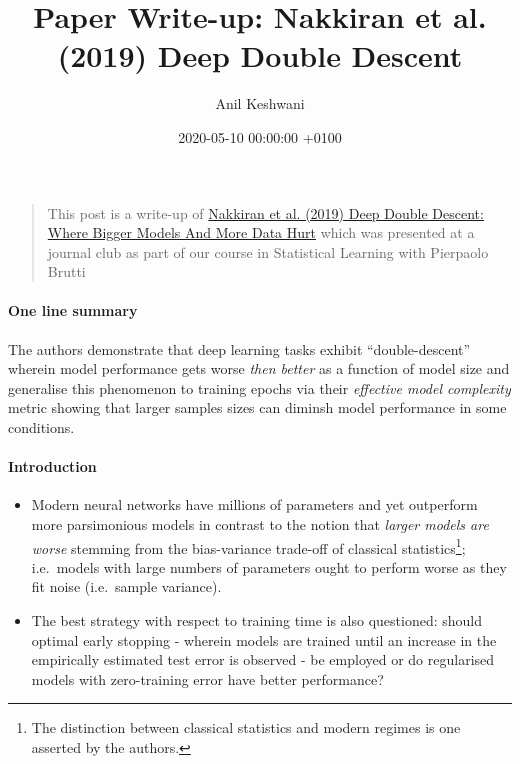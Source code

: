 \documentclass[]{article}
\title{Paper Write-up: Nakkiran et al. (2019) Deep Double Descent}
\author{Anil Keshwani}
\date{2020-05-10 00:00:00 +0100}
\providecommand{\tightlist}{%
  \setlength{\itemsep}{0pt}\setlength{\parskip}{0pt}}
\let\oldparagraph\paragraph
\renewcommand{\paragraph}[1]{\oldparagraph{#1}\mbox{}}
\begin{document}
\maketitle

\begin{quote}
This post is a write-up of
\href{https://arxiv.org/abs/1912.02292}{Nakkiran et al. (2019) Deep
Double Descent: Where Bigger Models And More Data Hurt} which was
presented at a journal club as part of our course in Statistical
Learning with Pierpaolo Brutti
\end{quote}

\hypertarget{one-line-summary}{%
\paragraph{One line summary}\label{one-line-summary}}

The authors demonstrate that deep learning tasks exhibit
``double-descent'' wherein model performance gets worse \emph{then
better} as a function of model size and generalise this phenomenon to
training epochs via their \emph{effective model complexity} metric
showing that larger samples sizes can diminsh model performance in some
conditions.

\hypertarget{introduction}{%
\paragraph{Introduction}\label{introduction}}

\begin{itemize}
\tightlist
\item
  Modern neural networks have millions of parameters and yet outperform
  more parsimonious models in contrast to the notion that \emph{larger
  models are worse} stemming from the bias-variance trade-off of
  classical statistics\footnote{The distinction between classical
    statistics and modern regimes is one asserted by the authors.};
  i.e.~models with large numbers of parameters ought to perform worse as
  they fit noise (i.e.~sample variance).
\item
  The best strategy with respect to training time is also questioned:
  should optimal early stopping - wherein models are trained until an
  increase in the empirically estimated test error is observed - be
  employed or do regularised models with zero-training error have better
  performance?
\end{itemize}
\end{document}
